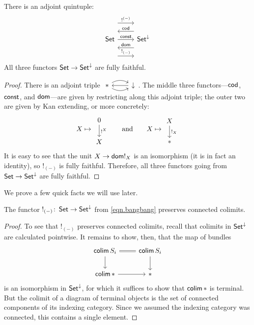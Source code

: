 \begin{prop}
  There is an adjoint quintuple:
  \[
    \begin{tikzcd}
      \Set \arrow[r, "\const"] \arrow[r, leftarrow, shift left = 5,
      "\term{cod}"] \arrow[r, leftarrow, shift right = 5, "\term{dom}"]
      \arrow[r, shift left = 10, "!^{(-)}"]  \arrow[r, shift right = 10, "!_{(-)}"] & \Set^{\down}
    \end{tikzcd}
  \]
  All three functors $\operatorname{\mathsf{{Set}}} \to \operatorname{\mathsf{{Set}}}^{\mathbin{\downarrow}}$ are fully faithful.
\end{prop}
\begin{proof}
There is an adjoint triple $\begin{tikzcd} \ast \arrow[r,leftarrow] \arrow[r,
  bend left] \arrow[r, bend right] & \down \end{tikzcd}$. The middle three
functors---$\mathsf{{cod}}$, $\mathsf{{const}}$, and $\mathsf{{dom}}$---are given by restricting along this adjoint triple; the outer two are
given by Kan extending, or more concretely:
  \begin{equation}\label{eqn.bangbang}
  X \mapsto \begin{tikzcd} 0 \arrow[d, "!^X"] \\ X \end{tikzcd}
  \qquad\text{and}\qquad
  X \mapsto \begin{tikzcd} X \arrow[d, "!_X"] \\ \ast \end{tikzcd}
  \end{equation}
 It is easy to see that the unit $X \to \mathsf{{dom}} !_{X}$ is an isomorphism (it is in
fact an identity), so $!_{(-)}$ is fully faithful. Therefore, all three functors
going from $\operatorname{\mathsf{{Set}}} \to \operatorname{\mathsf{{Set}}}^{\mathbin{\downarrow}}$ are fully faithful.
\end{proof}

We prove a few quick facts we will use later.
\begin{lem}\label{lem:bang.preserves.connected.colimits}
  The functor $!_{(-)}\colon\operatorname{\mathsf{{Set}}}\to\operatorname{\mathsf{{Set}}}^{\mathbin{\downarrow}}$ from \eqref{eqn.bangbang} preserves connected colimits.
\end{lem}
\begin{proof}
  To see that $!_{(-)}$ preserves connected colimits, recall that colimits in $\operatorname{\mathsf{{Set}}}^{\mathbin{\downarrow}}$ are calculated pointwise. It remains to show, then, that the map of bundles
  \[
    \begin{tikzcd}
    \colim S_i \arrow[r, equals] \arrow[d] & \colim S_i \arrow[d] \\
    \colim \ast \arrow[r] & \ast 
    \end{tikzcd}
  \]
  is an isomorphism in $\operatorname{\mathsf{{Set}}}^{\mathbin{\downarrow}}$, for which it suffices to show that
  $\operatorname{\mathsf{colim}} \ast$ is terminal. But the colimit of a diagram of terminal objects is the set
  of connected components of its indexing category. Since we assumed the
  indexing category was connected, this contains a single element.
\end{proof}

